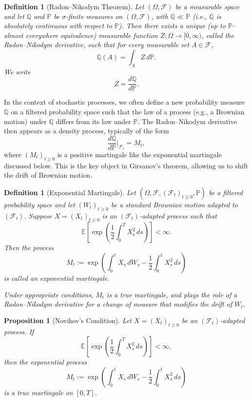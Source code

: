 \documentclass[11pt, twoside]{report}
\newtheorem{proposition}[theorem]{Proposition}
\newtheorem{definition}[theorem]{Definition}
\begin{document}
\begin{definition}[Radon--Nikodym Theorem]
Let $(\Omega, \mathcal{F})$ be a measurable space and let $\mathbb{Q}$ and $\mathbb{P}$ be $\sigma$-finite measures on $(\Omega, \mathcal{F})$, with $\mathbb{Q} \ll \mathbb{P}$ (i.e., $\mathbb{Q}$ is absolutely continuous with respect to $\mathbb{P}$). Then there exists a unique (up to $\mathbb{P}$-almost everywhere equivalence) measurable function $Z : \Omega \to [0,\infty)$, called the Radon--Nikodym derivative, such that for every measurable set $A \in \mathcal{F}$,
\[
\mathbb{Q}(A) = \int_A Z \, d\mathbb{P}.
\]
We write
\[
Z = \frac{d\mathbb{Q}}{d\mathbb{P}}.
\]
\end{definition}
In the context of stochastic processes, we often define a new probability measure $\mathbb{Q}$ on a filtered probability space such that the law of a process (e.g., a Brownian motion) under $\mathbb{Q}$ differs from its law under $\mathbb{P}$. The Radon--Nikodym derivative then appears as a density process, typically of the form
\[
\frac{d\mathbb{Q}}{d\mathbb{P}} \bigg|_{\mathcal{F}_t} = M_t,
\]
where $(M_t)_{t \geq 0}$ is a positive martingale like the exponential martingale discussed below. This is the key object in Girsanov’s theorem, allowing us to shift the drift of Brownian motion.

\begin{definition}[Exponential Martingale]
Let $(\Omega, \mathcal{F}, (\mathcal{F}_t)_{t \geq 0}, \mathbb{P})$ be a filtered probability space and let $(W_t)_{t \geq 0}$ be a standard Brownian motion adapted to $(\mathcal{F}_t)$. Suppose $X = (X_t)_{t \geq 0}$ is an $(\mathcal{F}_t)$-adapted process such that
\[
\mathbb{E} \left[ \exp\left( \frac{1}{2} \int_0^T X_s^2 \, ds \right) \right] < \infty.
\]
Then the process
\[
M_t := \exp\left( \int_0^t X_s \, dW_s - \frac{1}{2} \int_0^t X_s^2 \, ds \right)
\]
is called an \emph{exponential martingale}.

\medskip
Under appropriate conditions, $M_t$ is a true martingale, and plays the role of a Radon--Nikodym derivative for a change of measure that modifies the drift of $W_t$.
\end{definition}

\begin{proposition}[Novikov’s Condition] \label{nov_cond}
Let $X = (X_t)_{t \geq 0}$ be an $(\mathcal{F}_t)$-adapted process. If
\[
\mathbb{E} \left[ \exp\left( \frac{1}{2} \int_0^T X_s^2 \, ds \right) \right] < \infty,
\]
then the exponential process
\[
M_t := \exp\left( \int_0^t X_s \, dW_s - \frac{1}{2} \int_0^t X_s^2 \, ds \right)
\]
is a true martingale on $[0,T]$.
\end{proposition}
\medskip
\end{document}
